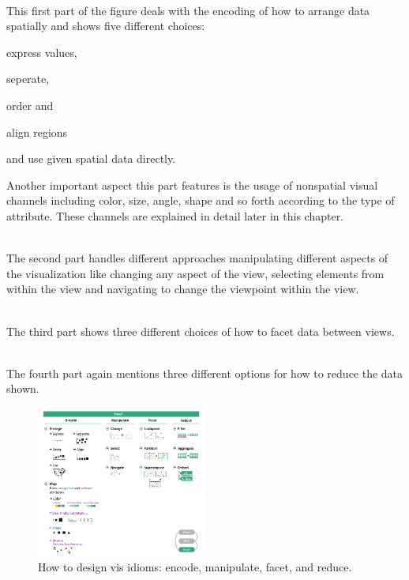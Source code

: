 \begin{enumerate}

 \hfill \\
This first part of the figure deals with the encoding of how to arrange data spatially and shows five different choices:
    \begin{enumerate*}
    \item express values,
    \item seperate,
    \item order and
    \item align regions
    \item and use given spatial data directly.
    \end{enumerate*}
Another important aspect this part features is the usage of nonspatial visual channels including color, size, angle, shape and so forth according to the type of attribute. These channels are explained in detail later in this chapter.

 \hfill \\
The second part handles different approaches manipulating different aspects of the visualization like changing any aspect of the view, selecting elements from within the view and navigating to change the viewpoint within the view.

 \hfill \\
The third part shows three different choices of how to facet data between views.

 \hfill \\
The fourth part again mentions three different options for how to reduce the data shown.

\end{enumerate}

\begin{figure}[!htb]
\centering
\includegraphics[width=0.5\textwidth,keepaspectratio]{images/basics/how.png}
\caption[
    How to design vis idioms: encode, manipulate, facet, and reduce .
]{How to design vis idioms: encode, manipulate, facet, and reduce.}
\label{fig:how}
\end{figure}

